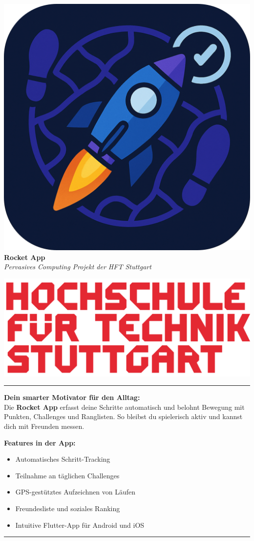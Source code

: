 \documentclass[a5paper,10pt]{article}
\begin{document}
\noindent
\begin{minipage}[t]{0.6\linewidth}
    \includegraphics[width=0.18\linewidth]{images/AppIcon.png}\\[0.3em]
    {\Huge\bfseries Rocket App}\\
    {\small \emph{Pervasives Computing Projekt der HFT Stuttgart}}
\end{minipage}%
\hfill
\begin{minipage}[t]{0.3\linewidth}
    \raggedleft
    \includegraphics[width=0.4\linewidth]{images/Logo-HFT-Stuttgart.png}
\end{minipage}

\vspace{0.3cm}
\hrule
\vspace{0.4cm}

\noindent
\textbf{Dein smarter Motivator für den Alltag:}\\
Die \textbf{Rocket App} erfasst deine Schritte automatisch und belohnt Bewegung mit Punkten, Challenges und Ranglisten. So bleibst du spielerisch aktiv und kannst dich mit Freunden messen.

\vspace{0.4cm}

\noindent
\textbf{Features in der App:}
\begin{itemize}
    \item Automatisches Schritt-Tracking
    \item Teilnahme an täglichen Challenges
    \item GPS-gestütztes Aufzeichnen von Läufen
    \item Freundesliste und soziales Ranking
    \item Intuitive Flutter-App für Android und iOS
\end{itemize}

\vspace{0.3cm}
\hrule
\vspace{0.3cm}
\end{document}
